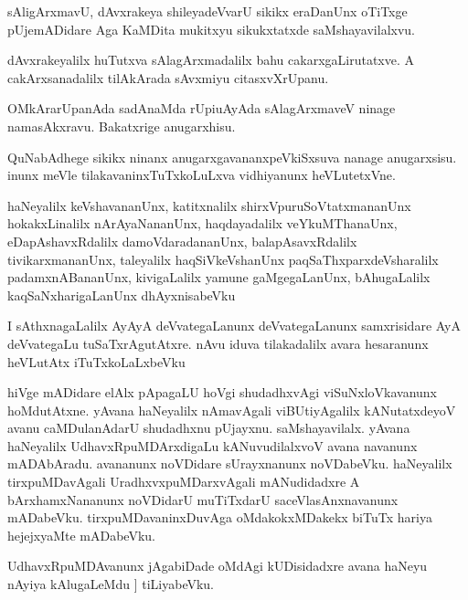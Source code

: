 \documentclass{article}
\begin{document}
\begin{mn}%
sAligArxmavU, dAvxrakeya shileyadeVvarU sikikx eraDanUnx oTiTxge pUjemADidare Aga KaMDita 
mukitxyu sikukxtatxde saMshayavilalxvu.
\end{mn}

\begin{mn}%
dAvxrakeyalilx huTutxva sAlagArxmadalilx bahu cakarxgaLirutatxve. A cakArxsanadalilx 
tilAkArada sAvxmiyu citasxvXrUpanu.
\end{mn}

\begin{mn}%
OMkArarUpanAda sadAnaMda rUpiuAyAda sAlagArxmaveV ninage namasAkxravu. Bakatxrige 
anugarxhisu.
\end{mn}

\begin{mn}%
QuNabAdhege sikikx ninanx anugarxgavananxpeVkiSxsuva nanage anugarxsisu. inunx meVle 
tilakavaninxTuTxkoLuLxva vidhiyanunx heVLutetxVne.
\end{mn}

\begin{mn}%
haNeyalilx keVshavananUnx, katitxnalilx shirxVpuruSoVtatxmananUnx hokakxLinalilx 
nArAyaNananUnx, haqdayadalilx veYkuMThanaUnx, eDapAshavxRdalilx damoVdaradananUnx, 
balapAsavxRdalilx tivikarxmananUnx, taleyalilx haqSiVkeVshanUnx paqSaThxparxdeVsharalilx 
padamxnABananUnx, kivigaLalilx yamune gaMgegaLanUnx, bAhugaLalilx kaqSaNxharigaLanUnx 
dhAyxnisabeVku
\end{mn}

\begin{mn}%
I sAthxnagaLalilx AyAyA deVvategaLanunx deVvategaLanunx samxrisidare AyA deVvategaLu 
tuSaTxrAgutAtxre. nAvu iduva tilakadalilx avara hesaranunx heVLutAtx iTuTxkoLaLxbeVku
\end{mn}

\begin{mn}%
hiVge mADidare elAlx pApagaLU hoVgi shudadhxvAgi viSuNxloVkavanunx hoMdutAtxne. yAvana 
haNeyalilx nAmavAgali viBUtiyAgalilx kANutatxdeyoV avanu caMDulanAdarU shudadhxnu 
pUjayxnu. saMshayavilalx. yAvana haNeyalilx UdhavxRpuMDArxdigaLu kANuvudilalxvoV avana
navanunx mADAbAradu. avananunx noVDidare sUrayxnanunx noVDabeVku. haNeyalilx 
tirxpuMDavAgali UradhxvxpuMDarxvAgali mANudidadxre A bArxhamxNananunx noVDidarU muTiTxdarU 
saceVlasAnxnavanunx mADabeVku. tirxpuMDavaninxDuvAga oMdakokxMDakekx biTuTx hariya 
hejejxyaMte mADabeVku. 
\end{mn}

\begin{mn}%
UdhavxRpuMDAvanunx jAgabiDade oMdAgi kUDisidadxre avana haNeyu nAyiya kAlugaLeMdu ]
tiLiyabeVku.
\end{mn}
\end{document}
